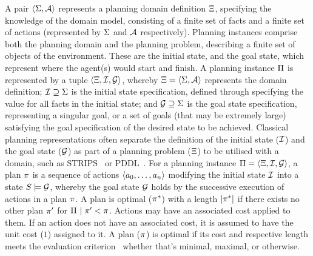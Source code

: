 A pair $\left\langle\Sigma,\mathcal{A}\right\rangle$ represents a planning domain definition $\Xi$, specifying the knowledge of the domain model, consisting of a finite set of facts and a finite set of actions (represented by $\Sigma$ and $\mathcal{A}$ respectively).
Planning instances comprise both the planning domain and the planning problem, describing a finite set of objects of the environment. These are the initial state, and the goal state, which represent where the agent(s) would start and finish.
A planning instance $\Pi$ is represented by a tuple $\left\langle\Xi,\mathcal{I},\mathcal{G}\right\rangle$, whereby $\Xi=\left\langle\Sigma,\mathcal{A}\right\rangle$ represents the domain definition; $\mathcal{I}\supseteq\Sigma$ is the initial state specification, defined through specifying the value for all facts in the initial state; and $\mathcal{G}\supseteq\Sigma$ is the goal state specification, representing a singular goal, or a set of goals (that may be extremely large) satisfying the goal specification of the desired state to be achieved.
Classical planning representations often separate the definition of the initial state ($\mathcal{I}$) and the goal state ($\mathcal{G}$) as part of a planning problem ($\Xi$) to be utilised with a domain, such as STRIPS~\cite{Fikes1971} or PDDL~\cite{PDDL1998}.
For a planning instance $\Pi=\left\langle\Xi,\mathcal{I},\mathcal{G}\right\rangle$, a plan $\pi$ is a sequence of actions $\left\langle a_0,\dots,a_n\right\rangle$ modifying the initial state $\mathcal{I}$ into a state $S\models\mathcal{G}$, whereby the goal state $\mathcal{G}$ holds by the successive execution of actions in a plan $\pi$. A plan is optimal ($\pi^{*}$) with a length $\vert\pi^{*}\vert$ if there exists no other plan $\pi'$ for $\Pi~\vert~ \pi'<\pi$.
Actions may have an associated cost applied to them. If an action does not have an associated cost, it is assumed to  have the unit cost ($1$) assigned to it. 
A plan ($\pi$) is optimal if its cost and respective length meets the evaluation criterion \textemdash~whether that's minimal, maximal, or otherwise.

